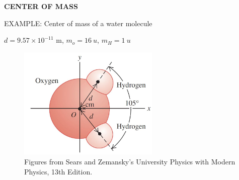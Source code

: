 \documentclass[]{beamer}
\begin{document}


\begin{frame}
    \textbf{CENTER OF MASS}
     \vspace{7mm}
     
   EXAMPLE: Center of mass of a water molecule
     \vspace{5mm}
   
$d=9.57\times 10^{-11}$ m, $m_o=16~u$, $m_H=1~u$
     \begin{figure}[h!]  
        \includegraphics[width=0.6\textwidth]{images/8.jpg}
        \caption{ {\tiny Figures from Sears and Zemansky's University Physics 
        with Modern Physics, 13th Edition.} }
      \end{figure}
     
     
     \end{frame}
 

\end{document}
